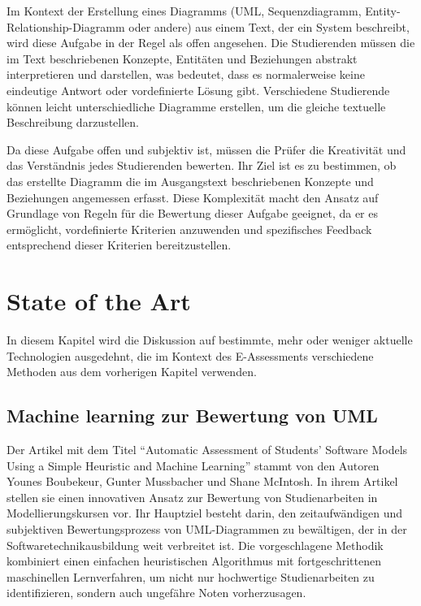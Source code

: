 Im Kontext der Erstellung eines Diagramms (UML, Sequenzdiagramm, Entity-Relationship-Diagramm oder andere) aus einem Text, der ein System beschreibt, wird diese Aufgabe in der Regel als offen angesehen. Die Studierenden müssen die im Text beschriebenen Konzepte, Entitäten und Beziehungen abstrakt interpretieren und darstellen, was bedeutet, dass es normalerweise keine eindeutige Antwort oder vordefinierte Lösung gibt. Verschiedene Studierende können leicht unterschiedliche Diagramme erstellen, um die gleiche textuelle Beschreibung darzustellen.

Da diese Aufgabe offen und subjektiv ist, müssen die Prüfer die Kreativität und das Verständnis jedes Studierenden bewerten. Ihr Ziel ist es zu bestimmen, ob das erstellte Diagramm die im Ausgangstext beschriebenen Konzepte und Beziehungen angemessen erfasst. Diese Komplexität macht den Ansatz auf Grundlage von Regeln für die Bewertung dieser Aufgabe geeignet, da er es ermöglicht, vordefinierte Kriterien anzuwenden und spezifisches Feedback entsprechend dieser Kriterien bereitzustellen.


\section{State of the Art}

In diesem Kapitel wird die Diskussion auf bestimmte, mehr oder weniger aktuelle Technologien ausgedehnt, die im Kontext des E-Assessments verschiedene Methoden aus dem vorherigen Kapitel verwenden.

\subsection{Machine learning zur Bewertung von UML}

Der Artikel mit dem Titel ``Automatic Assessment of Students’ Software Models Using a Simple Heuristic and Machine Learning'' \cite{boubekeur2020automatic} stammt von den Autoren Younes Boubekeur, Gunter Mussbacher und Shane McIntosh. In ihrem Artikel stellen sie einen innovativen Ansatz zur Bewertung von Studienarbeiten in Modellierungskursen vor. Ihr Hauptziel besteht darin, den zeitaufwändigen und subjektiven Bewertungsprozess von UML-Diagrammen zu bewältigen, der in der Softwaretechnikausbildung weit verbreitet ist. Die vorgeschlagene Methodik kombiniert einen einfachen heuristischen Algorithmus mit fortgeschrittenen maschinellen Lernverfahren, um nicht nur hochwertige Studienarbeiten zu identifizieren, sondern auch ungefähre Noten vorherzusagen.


